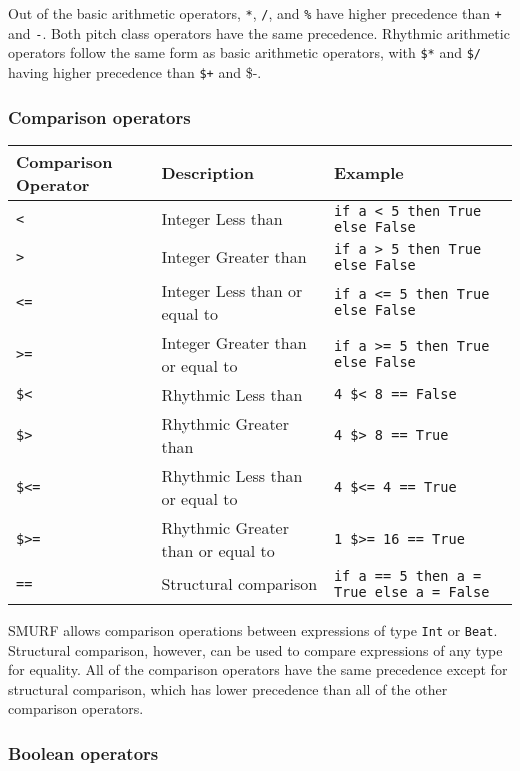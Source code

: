 Out of the basic arithmetic operators, \texttt{*}, \texttt{/}, and \texttt{\%} 
have higher precedence than \texttt{+} and \texttt{-}. 
Both pitch class operators have the same precedence. 
Rhythmic arithmetic operators follow the same form as basic arithmetic operators, with
\texttt{\$*} and \texttt{\$/} having higher precedence than \texttt{\$+} and {\$-}.

\subsubsection{Comparison operators}

\begin{table} [H]
\centering
\begin{tabular}{lll}
\hline\hline
Comparison Operator & Description & Example \\
\hline\hline
  \texttt{<}  & Integer Less than & \texttt{if a < 5 then True else False} \\ \hline
  \texttt{>}  & Integer Greater than & \texttt{if a > 5 then True else False}  \\ \hline
  \texttt{<=}  & Integer Less than or equal to & \texttt{if a <= 5 then True else False} \\ \hline
  \texttt{>=} & Integer Greater than or equal to & \texttt{if a >= 5 then True else False} \\ \hline
  \texttt{\$<} & Rhythmic Less than & \texttt{4 \$< 8 == False} \\ \hline
  \texttt{\$>}  & Rhythmic Greater than &  \texttt{4 \$> 8 == True}  \\ \hline
  \texttt{\$<=} & Rhythmic Less than or equal to & \texttt{4 \$<= 4 == True} \\ \hline
  \texttt{\$>=} & Rhythmic Greater than or equal to &  \texttt{1 \$>= 16 == True} \\ \hline
  \texttt{==} & Structural comparison & \texttt{if a == 5 then a = True else a = False} \\ \hline
\end{tabular}
\end{table}

SMURF allows comparison operations between expressions of type \texttt{Int} or \texttt{Beat}.
Structural comparison, however, can be used to compare expressions of any type for equality.
All of the comparison operators have the same precedence except for structural comparison, which
has lower precedence than all of the other comparison operators.

\subsubsection{Boolean operators}


